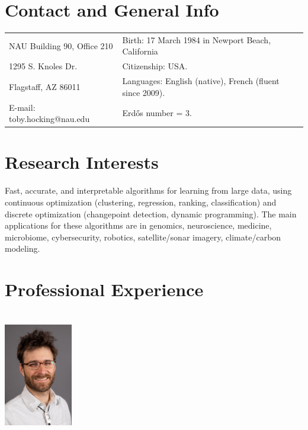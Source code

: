 \documentclass[margin,line]{res}
\begin{document}

\begin{resume}
\section{\sc Contact and General Info}
\vspace{.05in}
\begin{tabular*}{6.1in} {@{\extracolsep{\fill}}ll}
 NAU Building 90, Office 210 & Birth: 17 March 1984 in Newport Beach, California\\
 1295 S. Knoles Dr.  & Citizenship: USA. \\            
  Flagstaff, AZ 86011 & Languages: English (native), French
                        (fluent since 2009). \\
  E-mail:  toby.hocking@nau.edu & Erd\H{o}s number = 3. \\
\end{tabular*}

\section{\sc Research Interests}

Fast, accurate, and interpretable algorithms for learning from large
data, using continuous optimization (clustering, regression, ranking,
classification) and discrete optimization (changepoint detection,
dynamic programming). The main applications for these
algorithms are in genomics, neuroscience, medicine, microbiome,
cybersecurity, robotics, satellite/sonar imagery, climate/carbon
modeling.

\section{\sc Professional Experience \\ \hspace{0.1cm} \\ \includegraphics[width=3cm]{HOCKING-rectangle-lores.jpg}}


\end{resume}
\end{document}
